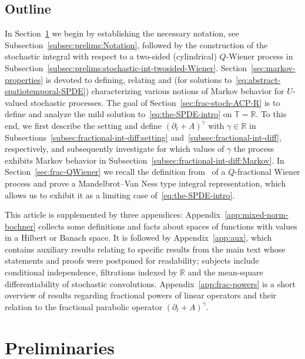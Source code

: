 \documentclass[reqno]{amsart}
\numberwithin{equation}{section}
\newcommand{\bbR}{\mathbb{R}}
\newcommand{\bbT}{\mathbb{T}}
\newcommand{\R}{\mathbb{R}}
\theoremstyle{remark}
\theoremstyle{definition}
\begin{document}
\subsection{Outline}
In Section~\ref{sec:prelims} we begin by establishing the necessary notation, see Subsection~\ref{subsec:prelims:Notation},
followed by the construction of the stochastic integral with respect to a two-sided
(cylindrical)
$Q$-Wiener process in Subsection~\ref{subsec:prelims:stochastic-int-twosided-Wiener}.
Section~\ref{sec:markov-properties} is devoted to
defining, relating and 
(for solutions to~\eqref{eq:abstract-spatiotemporal-SPDE}) 
characterizing various notions of Markov behavior for $U$-valued stochastic processes.
The goal of Section~\ref{sec:frac-stoch-ACP-R} is to define and analyze
the
mild solution to~\eqref{eq:the-SPDE-intro} on $\bbT = \R$.
To this end, we first
describe the setting and define $(\partial_t + A)^\gamma$ with $\gamma \in \R$
in Subsections~\ref{subsec:fractional-int-diff:setting} and~\ref{subsec:fractional-int-diff}, respectively,
and subsequently investigate for which values of $\gamma$ the process exhibits Markov behavior in Subsection~\ref{subsec:fractional-int-diff:Markov}.
In Section~\ref{sec:frac-QWiener} we recall
the definition from~\cite{Duncan2002} of a $Q$-fractional Wiener process
and prove a Mandelbrot--Van Ness type integral representation, which allows us to exhibit it as a limiting case of~\eqref{eq:the-SPDE-intro}.

This article is supplemented by three appendices: 
Appendix~\ref{app:mixed-norm-bochner} collects some definitions and facts about 
spaces of functions with values in a Hilbert or Banach space.
It is followed by
Appendix~\ref{app:aux}, which
contains auxiliary results
relating to specific results from the main text
whose statements and proofs were postponed for readability;
subjects include
conditional independence, filtrations indexed by $\bbR$
and the mean-square differentiability of stochastic convolutions. 
Appendix~\ref{app:frac-powers} 
is a short overview of results
regarding fractional powers of linear operators and 
their relation to the fractional parabolic operator $(\partial_t + A)^\gamma$.

\section{Preliminaries}
\label{sec:prelims}
\end{document}
